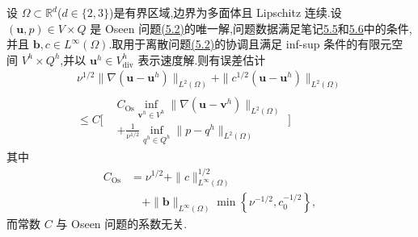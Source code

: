 \begin{theorem}[速度的有限元误差估计]\label{thm:oseen-fem-velocity-error}
设 $\Omega\subset\mathbb{R}^d$($d\in\{2,3\}$)是有界区域,边界为多面体且 Lipschitz 连续.设 $(\bm{u},p)\in V\times Q$ 是 Oseen 问题\hyperref[eq:oseen-weak]{(5.2)}的唯一解,问题数据满足笔记\hyperref[note:oseen-minimal-regularity]{5.5}和\hyperref[note:oseen-skew-symmetry]{5.6}中的条件,并且 $\bm{b},c\in L^\infty(\Omega)$.取用于离散问题\hyperref[eq:oseen-weak]{(5.2)}的协调且满足 inf-sup 条件的有限元空间 $V^h\times Q^h$,并以 $\bm{u}^h\in V_{\mathrm{div}}^h$ 表示速度解.则有误差估计
\begin{equation}\label{eq:oseen-fem-velocity-error}
\begin{gathered}
  \nu^{1/2}\|\nabla(\bm{u}-\bm{u}^h)\|_{L^2(\Omega)}
    +\|c^{1/2}(\bm{u}-\bm{u}^h)\|_{L^2(\Omega)}\\
  \le C\Biggl[
    \begin{aligned}
      &C_{\mathrm{Os}}\inf_{\bm{v}^h\in V^h}
         \|\nabla(\bm{u}-\bm{v}^h)\|_{L^2(\Omega)}\\
      &+\frac{1}{\nu^{1/2}}\inf_{q^h\in Q^h}
         \|p-q^h\|_{L^2(\Omega)}
    \end{aligned}
    \Biggr]
\end{gathered}
\end{equation}
其中
\begin{equation}\label{eq:oseen-fem-error-constant}
  \begin{aligned}
    C_{\mathrm{Os}}
      &=\nu^{1/2}+\|c\|_{L^\infty(\Omega)}^{1/2}\\
      &\quad+\|\bm{b}\|_{L^\infty(\Omega)}
       \min\left\{\nu^{-1/2},c_0^{-1/2}\right\},
  \end{aligned}
\end{equation}
而常数 $C$ 与 Oseen 问题的系数无关.
\end{theorem}
